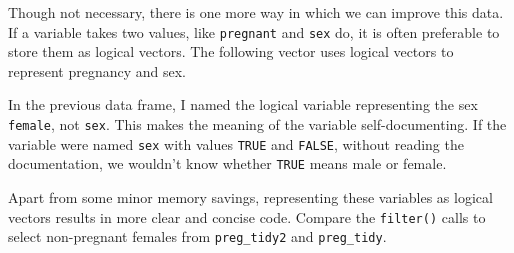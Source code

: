\documentclass[]{book}
\newenvironment{Shaded}{\begin{snugshade}}{\end{snugshade}}
\newcommand{\CommentTok}[1]{\textcolor[rgb]{0.56,0.35,0.01}{\textit{#1}}}
\newcommand{\DataTypeTok}[1]{\textcolor[rgb]{0.13,0.29,0.53}{#1}}
\newcommand{\KeywordTok}[1]{\textcolor[rgb]{0.13,0.29,0.53}{\textbf{#1}}}
\newcommand{\NormalTok}[1]{#1}
\newcommand{\OperatorTok}[1]{\textcolor[rgb]{0.81,0.36,0.00}{\textbf{#1}}}
\newcommand{\OtherTok}[1]{\textcolor[rgb]{0.56,0.35,0.01}{#1}}
\newcommand{\StringTok}[1]{\textcolor[rgb]{0.31,0.60,0.02}{#1}}
\theoremstyle{plain}
\theoremstyle{remark}
\begin{document}
\begin{Shaded}
\end{Shaded}

Though not necessary, there is one more way in which we can improve this data.
If a variable takes two values, like \texttt{pregnant} and \texttt{sex} do, it is often preferable to store them as logical vectors.
The following vector uses logical vectors to represent pregnancy and sex.

\begin{Shaded}
\end{Shaded}

In the previous data frame, I named the logical variable representing the sex \texttt{female}, not \texttt{sex}.
This makes the meaning of the variable self-documenting.
If the variable were named \texttt{sex} with values \texttt{TRUE} and \texttt{FALSE}, without reading the documentation, we wouldn't know whether \texttt{TRUE} means male or female.

Apart from some minor memory savings, representing these variables as logical
vectors results in more clear and concise code.
Compare the \texttt{filter()} calls to select non-pregnant females from \texttt{preg\_tidy2} and \texttt{preg\_tidy}.
\end{document}
